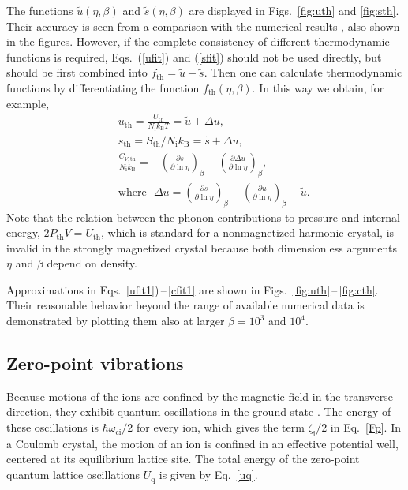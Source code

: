 \documentclass[traditabstract]{aa}
\newcommand{\bea}{\begin{eqnarray}}
\newcommand{\eea}{\end{eqnarray}}
\newcommand{\req}[1]{Eq.~\ref{#1}}
\newcommand{\Nion}{N_\mathrm{i}}
\newcommand{\kB}{k_\mathrm{B}}
\newcommand{\omci}{\omega_\mathrm{ci}}
\newcommand{\Uq}{U_\mathrm{q}}
\newcommand{\zeti}{\zeta_\mathrm{i}}
\begin{document}
{The functions $\tilde{u}(\eta,\beta)$ and
$\tilde{s}(\eta,\beta)$ are displayed in Figs.~\ref{fig:uth}
and \ref{fig:sth}. Their accuracy is seen from a
comparison with the  numerical results \citep{Baiko09}, also
shown in the figures. However, if the complete consistency
of different thermodynamic functions is required,
Eqs.~(\ref{ufit}) and (\ref{sfit}) should not be used
directly, but should be first combined into 
$
   f_{\mathrm{th}}=\tilde{u}-\tilde{s}.
$
Then one can  calculate thermodynamic functions
by differentiating the function $f_{\mathrm{th}}(\eta,\beta)$. 
In this way we obtain, for example,
\bea&&
   u_{\mathrm{th}}=\frac{U_{\mathrm{th}} }{ \Nion\kB T } 
        = \tilde{u} + \Delta u,
\label{ufit1}
\\&&
  s_{\mathrm{th}}= {S_{\mathrm{th}} }/{\Nion\kB} =
     \tilde{s} + \Delta u,
\label{sfit1}
\\&&
\frac{C_{V,\mathrm{th}} }{\Nion\kB} =
   -
\left(\frac{\partial\tilde{s}}{\partial\ln\eta}\right)_\beta
   - \left(\frac{\partial\Delta u
         }{
           \partial\ln\eta}\right)_\beta,
\label{cfit1}
\\&&
\mbox{where~~}
\Delta u=
    \left(\frac{\partial\tilde{s}}{\partial\ln\eta}\right)_\beta
     - \left(\frac{\partial\tilde{u}}{\partial\ln\eta}\right)_\beta
        - \tilde{u}.
\eea
Note that the relation between the
phonon contributions to pressure and internal energy,
$2P_\mathrm{th}V=U_\mathrm{th}$, which is standard
for a nonmagnetized harmonic crystal, is invalid in the
strongly magnetized crystal because both dimensionless
arguments $\eta$ and $\beta$ depend on density.

Approximations in Eqs.~\ref{ufit1})\,--\,\ref{cfit1} are shown in
Figs.~\ref{fig:uth}\,--\,\ref{fig:cth}. Their reasonable
behavior beyond the range of available numerical data is
demonstrated by plotting them also at larger $\beta=10^3$
and $10^4$.

\subsection{Zero-point vibrations}

Because motions of the ions are confined by the magnetic
field in the transverse direction, they
exhibit quantum oscillations in the ground state
\citep{Landau30,LaLi-QM}. The energy of these
oscillations is
$\hbar\omci/2$ for every ion, which gives the term $\zeti/2$ in
\req{Fp}. In a Coulomb crystal, the motion of an ion
is confined in an effective potential well, centered
at its equilibrium lattice site. The total energy of the
zero-point quantum lattice oscillations $\Uq$
is given by \req{uq}.

}
\end{document}
